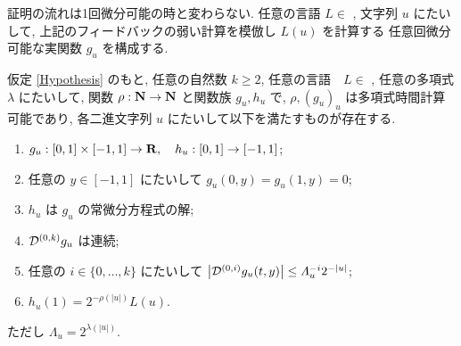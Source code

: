  証明の流れは1回微分可能の時と変わらない.
 任意の言語 $L \in $ \PSPACE, 文字列 $u$ にたいして,
 上記のフィードバックの弱い計算を模倣し $L(u)$ を計算する
 任意回微分可能な実関数 $g_u$ を構成する.

 \begin{lemma}
  \label{KTimesFamily}
  仮定 \ref{Hypothesis} のもと, 任意の自然数 $k \ge 2$,
  任意の言語　$L \in$ \PSPACE, 任意の多項式 $\lambda$ にたいして,
  関数 $\rho : \mathbf N \to \mathbf N$ と関数族 $g_u, h_u$ で,
  $\rho, (g_u)_u$ は多項式時間計算可能であり,
  各二進文字列 $u$ にたいして以下を満たすものが存在する.
  \begin{enumerate}
   \item $g_u:[0,1] \times [-1,1]\to \mathbf R, \quad h_u: [0,1] \to [-1,1]$;
   \item 任意の $y \in [-1,1]$ にたいして $g_u(0,y) = g_u(1,y) = 0 $;
   \item $h_u$ は $g_u$ の常微分方程式の解;
   \item $\mathcal D^{(0,k)} g_u$ は連続;
   \item 任意の $i \in \{0, \dots, k\}$ にたいして
	 $\left|\mathcal D^{(0,i)} g_u(t,y)\right| 
		\le \varLambda_u^{-i}2^{-|u|}$;
	 \label{enum:lem:differentiable}
   \item $h_u(1) = 2^{-\rho(|u|)}L(u)$.
  \end{enumerate}
  ただし $\Lambda_u = 2^{\lambda(|u|)}$.
 \end{lemma}
 

